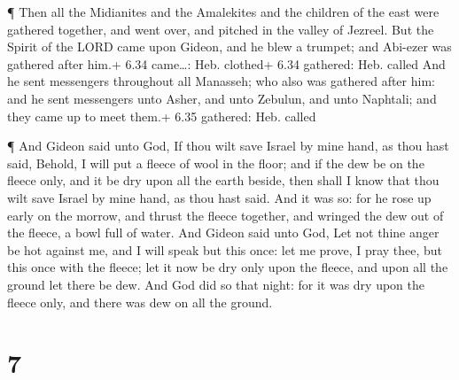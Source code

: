  ¶ Then all the Midianites and the Amalekites and the
children of the east were gathered together, and went over, and pitched
in the valley of Jezreel.  But the Spirit of the LORD came
upon Gideon, and he blew a trumpet; and Abi-ezer was gathered after
him.+ 6.34 came\ldots: Heb. clothed+ 6.34 gathered: Heb. called
 And he sent messengers throughout all Manasseh; who also
was gathered after him: and he sent messengers unto Asher, and unto
Zebulun, and unto Naphtali; and they came up to meet them.+ 6.35
gathered: Heb. called

 ¶ And Gideon said unto God, If thou wilt save Israel by
mine hand, as thou hast said,  Behold, I will put a fleece
of wool in the floor; and if the dew be on the fleece only, and it be
dry upon all the earth beside, then shall I know that thou wilt save
Israel by mine hand, as thou hast said.  And it was so: for
he rose up early on the morrow, and thrust the fleece together, and
wringed the dew out of the fleece, a bowl full of water. 
And Gideon said unto God, Let not thine anger be hot against me, and I
will speak but this once: let me prove, I pray thee, but this once with
the fleece; let it now be dry only upon the fleece, and upon all the
ground let there be dew.  And God did so that night: for it
was dry upon the fleece only, and there was dew on all the ground.

\hypertarget{section-6}{%
\section{7}\label{section-6}}

